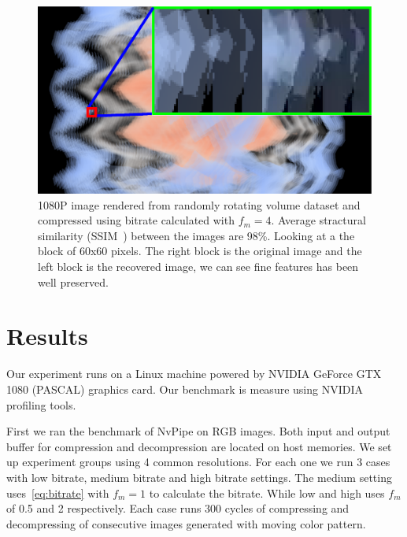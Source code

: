 \documentclass[review]{vgtc}                 %
\begin{document}
\begin{figure}[h]
  \centering
  \includegraphics[width=\columnwidth]{quality.eps}
  \caption{1080P image rendered from randomly rotating volume dataset and compressed using bitrate calculated with \(f_m=4\). Average stractural similarity (SSIM~\cite{wang2004image}) between the images are 98\%. Looking at a the block of 60x60 pixels. The right block is the original image and the left block is the recovered image, we can see fine features has been well preserved. }
  \label{fig:quality}
\end{figure}

\section{Results}

Our experiment runs on a Linux machine powered by NVIDIA GeForce GTX 1080 (PASCAL) graphics card. Our benchmark is measure using NVIDIA profiling tools.

First we ran the benchmark of NvPipe on RGB images. Both input and output buffer for compression and decompression are located on host memories. We set up experiment groups using 4 common resolutions. For each one we run 3 cases with low bitrate, medium bitrate and high bitrate settings. The medium setting uses~\cref{eq:bitrate} with \(f_m = 1\) to calculate the bitrate. While low and high uses \(f_m\) of 0.5 and 2 respectively. Each case runs 300 cycles of compressing and decompressing of consecutive images generated with moving color pattern.
\end{document}

